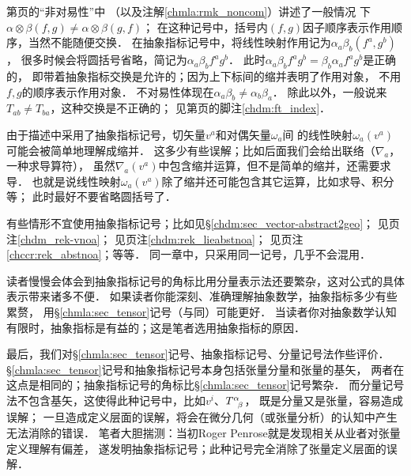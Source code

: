  第\pageref{chmla:sec_noncom}页的“非对易性”中
（以及注解\ref{chmla:rmk_noncom}）讲述了一般情况
下$\alpha \otimes \beta(f,g) \neq \alpha \otimes \beta(g,f)$；
在这种记号中，括号内$(f,g)$因子顺序表示作用顺序，当然不能随便交换．
在抽象指标记号中，将线性映射作用记为$\alpha _a \beta _b (f^a, g^b)$，
很多时候会将圆括号省略，简记为$\alpha _a \beta _b f^a g^b$．
此时$\alpha _a \beta _b f^a g^b=\beta_b \alpha_a f^a g^b$是正确的，
即带着抽象指标交换是允许的；因为上下标间的缩并表明了作用对象，
不用$f,g$的顺序表示作用对象．
不对易性体现在$\alpha _a \beta _b \neq \alpha_b \beta_a$．
除此以外，一般说来$T_{ab}\neq T_{ba}$，这种交换是不正确的；
见第\pageref{chdm:ft_index}页的脚注\ref{chdm:ft_index}．

 由于描述中采用了抽象指标记号，切矢量$v^a$和对偶矢量$\omega_a$间
的线性映射$\omega_a(v^a)$可能会被简单地理解成缩并．
这多少有些误解；比如后面我们会给出联络（$\nabla_a$，一种求导算符），
虽然$\nabla_a (v^a)$中包含缩并运算，但不是简单的缩并，还需要求导．
也就是说线性映射$\omega_a(v^a)$除了缩并还可能包含其它运算，比如求导、积分等；
此时最好不要省略圆括号了．


  有些情形不宜使用抽象指标记号；比如见\S \ref{chdm:sec_vector-abstract2geo}；
见\pageref{chdm_rek-vnoa}页注\ref{chdm_rek-vnoa}；
见\pageref{chdm:rek_lieabstnoa}页注\ref{chdm:rek_lieabstnoa}；
见\pageref{chccr:rek_abstnoa}页注\ref{chccr:rek_abstnoa}；等等．
同一章中，只采用同一记号，几乎不会混用．




读者慢慢会体会到抽象指标记号的角标比用分量表示法还要繁杂，这对公式的具体表示带来诸多不便．
如果读者你能深刻、准确理解抽象数学，抽象指标多少有些累赘，
用\S\ref{chmla:sec_tensor}记号（与\textcite{cc2001-zh}同）可能更好．
当读者你对抽象数学认知有限时，抽象指标是有益的；这是笔者选用抽象指标的原因．




最后，我们对\S\ref{chmla:sec_tensor}记号、抽象指标记号、分量记号法作些评价．
\S\ref{chmla:sec_tensor}记号和抽象指标记号本身包括张量分量和张量的基矢，
两者在这点是相同的；抽象指标记号的角标比\S\ref{chmla:sec_tensor}记号繁杂．
而分量记号法不包含基矢，这使得此种记号中，比如$v^i$、$T^\alpha_{\hphantom{\alpha}\beta}$，
既是分量又是张量，容易造成误解；
一旦造成定义层面的误解，将会在微分几何（或张量分析）的认知中产生无法消除的错误．
笔者大胆揣测：当初Roger Penrose就是发现相关从业者对张量定义理解有偏差，
遂发明抽象指标记号；此种记号完全消除了张量定义层面的误解．


